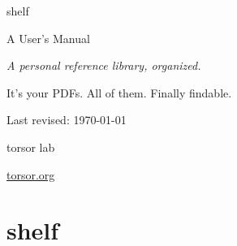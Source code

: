 \documentclass[12pt, openany]{book}
\begin{document}
\color{inkbody}

\begin{titlepage}
  \centering
  \vspace*{3cm}
  {\Huge\rmfamily\color{inkdark} shelf\par}
  \vspace{0.5cm}
  {\Large\sffamily\color{inkmuted} A User's Manual\par}
  \vspace{0.3cm}
  {\normalsize\itshape\color{inkmuted} A personal reference library, organized.\par}
  \vspace{3cm}
  {\normalsize\color{inkbody} It's your PDFs. All of them. Finally findable.\par}
  \vfill
  {\small\color{inkdim} Last revised: \today}
\end{titlepage}

\thispagestyle{empty}
\null\vfill
\begin{center}
  {\small\color{inkmuted} torsor lab\par}
  \vspace{0.4em}
  {\small\href{https://torsor.org}{\color{terracotta} torsor.org}}
\end{center}
\clearpage

\frontmatter
\setcounter{tocdepth}{1}
\tableofcontents



\mainmatter

\part{shelf}
\end{document}
